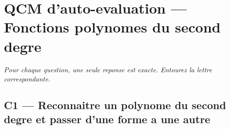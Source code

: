 

\section*{QCM d'auto-evaluation — Fonctions polynomes du second degre}

\begin{center}
\textit{Pour chaque question, une seule reponse est exacte. Entourez la lettre correspondante.}
\end{center}

\bigskip

\subsection*{C1 — Reconnaitre un polynome du second degre et passer d'une forme a une autre}

